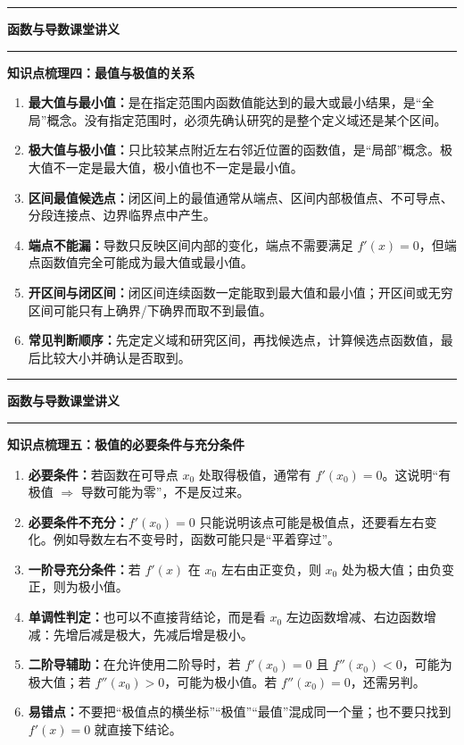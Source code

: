 \documentclass[12pt,a4paper]{ctexart}
\newcommand{\lessonTitle}[2]{
  \begin{center}
    {\LARGE\bfseries #1}
  \end{center}
  \vspace{0.2em}
  \hrule
  \vspace{0.8em}
}
\begin{document}
\hrule

\newpage
\lessonTitle{函数与导数课堂讲义}{}

\textbf{\large 知识点梳理四：最值与极值的关系}

\begin{enumerate}
  \item \textbf{最大值与最小值：}是在指定范围内函数值能达到的最大或最小结果，是“全局”概念。没有指定范围时，必须先确认研究的是整个定义域还是某个区间。
  \item \textbf{极大值与极小值：}只比较某点附近左右邻近位置的函数值，是“局部”概念。极大值不一定是最大值，极小值也不一定是最小值。
  \item \textbf{区间最值候选点：}闭区间上的最值通常从端点、区间内部极值点、不可导点、分段连接点、边界临界点中产生。
  \item \textbf{端点不能漏：}导数只反映区间内部的变化，端点不需要满足 $f'(x)=0$，但端点函数值完全可能成为最大值或最小值。
  \item \textbf{开区间与闭区间：}闭区间连续函数一定能取到最大值和最小值；开区间或无穷区间可能只有上确界/下确界而取不到最值。
  \item \textbf{常见判断顺序：}先定定义域和研究区间，再找候选点，计算候选点函数值，最后比较大小并确认是否取到。
\end{enumerate}

\vspace{0.5em}
\hrule

\newpage
\lessonTitle{函数与导数课堂讲义}{}

\textbf{\large 知识点梳理五：极值的必要条件与充分条件}

\begin{enumerate}
  \item \textbf{必要条件：}若函数在可导点 $x_0$ 处取得极值，通常有 $f'(x_0)=0$。这说明“有极值 $\Rightarrow$ 导数可能为零”，不是反过来。
  \item \textbf{必要条件不充分：}$f'(x_0)=0$ 只能说明该点可能是极值点，还要看左右变化。例如导数左右不变号时，函数可能只是“平着穿过”。
  \item \textbf{一阶导充分条件：}若 $f'(x)$ 在 $x_0$ 左右由正变负，则 $x_0$ 处为极大值；由负变正，则为极小值。
  \item \textbf{单调性判定：}也可以不直接背结论，而是看 $x_0$ 左边函数增减、右边函数增减：先增后减是极大，先减后增是极小。
  \item \textbf{二阶导辅助：}在允许使用二阶导时，若 $f'(x_0)=0$ 且 $f''(x_0)<0$，可能为极大值；若 $f''(x_0)>0$，可能为极小值。若 $f''(x_0)=0$，还需另判。
  \item \textbf{易错点：}不要把“极值点的横坐标”“极值”“最值”混成同一个量；也不要只找到 $f'(x)=0$ 就直接下结论。
\end{enumerate}
\end{document}
